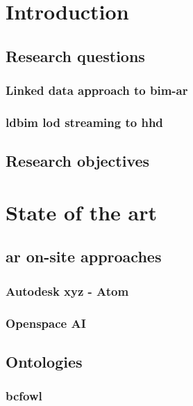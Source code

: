 \documentclass[12pt,a4paper,faculty=ea,language=en,doctype=report]{ugent-doc}
\renewcommand{\ULthickness}{2pt} %
\begin{document}
\maketitle
\renewcommand{\ULthickness}{1pt}
{\hypersetup{hidelinks}\tableofcontents} %
\listoffigures
\newpage



% 

\chapter{Introduction}
  \section{Research questions}
    \subsection{Linked data approach to \acs{bim}-\acs{ar}}
    \subsection{\acs{ldbim} \acs{lod} streaming to \acs{hhd}}
  \section{Research objectives}
  
\chapter{State of the art}
  \section{\acs{ar} on-site approaches}
    \subsection{Autodesk xyz - Atom}
    \subsection{Openspace AI}

  \section{Ontologies}
    \subsection{\acs{bcfowl}}
\end{document}
